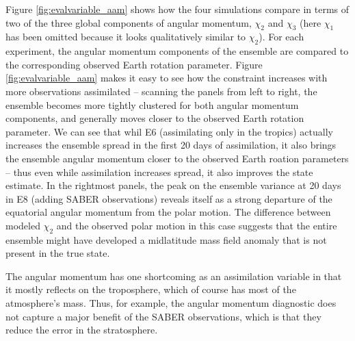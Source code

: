 Figure \ref{fig:evalvariable_aam} shows how the four simulations compare in terms of two of the three global components of angular momentum, $\chi_2$ and $\chi_3$ (here $\chi_1$ has been omitted because it looks qualitatively similar to $\chi_2$).  
For each experiment, the angular momentum components of the ensemble are compared  to the corresponding observed Earth rotation parameter. 
Figure  \ref{fig:evalvariable_aam} makes it easy to see how the constraint increases with more observations assimilated -- scanning the panels from left to right, the ensemble becomes more tightly clustered for both angular momentum components, and generally moves closer to the observed Earth rotation parameter. 
We can see that whil E6 (assimilating only in the tropics) actually increases the ensemble spread in the first 20 days of assimilation, it also brings the ensemble angular momentum closer to the observed Earth roation parameters -- thus even while assimilation increases spread, it also improves the state estimate. 
In the rightmost panels, the peak on the ensemble variance at 20 days in E8 (adding SABER observations) reveals itself as a strong departure of the equatorial angular momentum from the polar motion.   
The difference between modeled $\chi_2$ and the observed polar motion in this case suggests that the entire ensemble might have developed a midlatitude mass field anomaly that is not present in the true state. 

The angular momentum has one shortcoming as an assimilation variable in that it mostly reflects on the troposphere, which of course has most of the atmosphere's mass.
Thus, for example, the angular momentum diagnostic does not capture a major benefit of the SABER observations, which is that they reduce the error in the stratosphere. 
